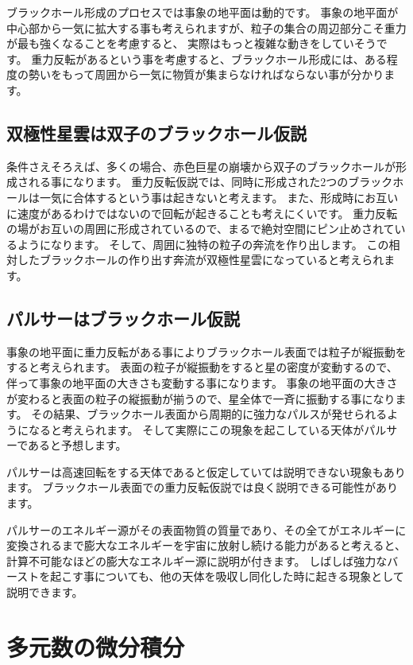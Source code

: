 \documentclass[a4paper,12pt,notitlepage]{jsreport}
\begin{document}
ブラックホール形成のプロセスでは事象の地平面は動的です。
事象の地平面が中心部から一気に拡大する事も考えられますが、粒子の集合の周辺部分こそ重力が最も強くなることを考慮すると、
実際はもっと複雑な動きをしていそうです。
重力反転があるという事を考慮すると、ブラックホール形成には、ある程度の勢いをもって周囲から一気に物質が集まらなければならない事が分かります。

\section{双極性星雲は双子のブラックホール仮説}

条件さえそろえば、多くの場合、赤色巨星の崩壊から双子のブラックホールが形成される事になります。
重力反転仮説では、同時に形成された2つのブラックホールは一気に合体するという事は起きないと考えます。
また、形成時にお互いに速度があるわけではないので回転が起きることも考えにくいです。
重力反転の場がお互いの周囲に形成されているので、まるで絶対空間にピン止めされているようになります。
そして、周囲に独特の粒子の奔流を作り出します。
この相対したブラックホールの作り出す奔流が双極性星雲になっていると考えられます。

\section{パルサーはブラックホール仮説}

事象の地平面に重力反転がある事によりブラックホール表面では粒子が縦振動をすると考えられます。
表面の粒子が縦振動をすると星の密度が変動するので、伴って事象の地平面の大きさも変動する事になります。
事象の地平面の大きさが変わると表面の粒子の縦振動が揃うので、星全体で一斉に振動する事になります。
その結果、ブラックホール表面から周期的に強力なパルスが発せられるようになると考えられます。
そして実際にこの現象を起こしている天体がパルサーであると予想します。

パルサーは高速回転をする天体であると仮定していては説明できない現象もあります。
ブラックホール表面での重力反転仮説では良く説明できる可能性があります。

パルサーのエネルギー源がその表面物質の質量であり、その全てがエネルギーに変換されるまで膨大なエネルギーを宇宙に放射し続ける能力があると考えると、
計算不可能なほどの膨大なエネルギー源に説明が付きます。
しばしば強力なバーストを起こす事についても、他の天体を吸収し同化した時に起きる現象として説明できます。

\chapter{多元数の微分積分}
\end{document}
